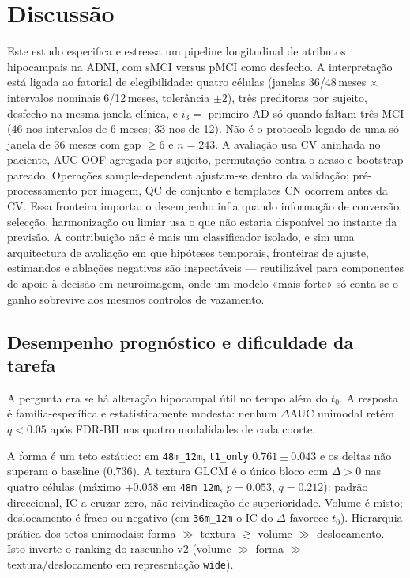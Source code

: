 \documentclass[review]{elsarticle}
\newcommand{\code}[1]{\texttt{#1}}
\begin{document}

\section{Discussão}
\label{sec:discussao}

Este estudo especifica e estressa um pipeline longitudinal de atributos hipocampais na ADNI, com sMCI versus pMCI como desfecho.
A interpretação está ligada ao fatorial de elegibilidade: quatro células (janelas 36/48\,meses $\times$ intervalos nominais 6/12\,meses, tolerância $\pm 2$), três preditoras por sujeito, desfecho na mesma janela clínica, e $i_3=$ primeiro AD só quando faltam três MCI (46 nos intervalos de 6 meses; 33 nos de 12).
Não é o protocolo legado de uma só janela de 36 meses com gap $\ge 6$ e $n=243$.
A avaliação usa CV aninhada no paciente, AUC OOF agregada por sujeito, permutação contra o acaso e bootstrap pareado.
Operações sample-dependent ajustam-se dentro da validação; pré-processamento por imagem, QC de conjunto e templates CN ocorrem antes da CV.
Essa fronteira importa: o desempenho infla quando informação de conversão, selecção, harmonização ou limiar usa o que não estaria disponível no instante da previsão.
A contribuição não é mais um classificador isolado, e sim uma arquitectura de avaliação em que hipóteses temporais, fronteiras de ajuste, estimandos e ablações negativas são inspectáveis --- reutilizável para componentes de apoio à decisão em neuroimagem, onde um modelo «mais forte» só conta se o ganho sobrevive aos mesmos controlos de vazamento.

\subsection{Desempenho prognóstico e dificuldade da tarefa}

A pergunta era se há alteração hipocampal útil no tempo além do $t_0$.
A resposta é família-específica e estatisticamente modesta: nenhum $\Delta$AUC unimodal retém $q<0.05$ após FDR-BH nas quatro modalidades de cada coorte.

A forma é um teto estático: em \code{48m\_12m}, \code{t1\_only} $0.761\pm0.043$ e os deltas não superam o baseline ($0.736$).
A textura GLCM é o único bloco com $\Delta>0$ nas quatro células (máximo $+0.058$ em \code{48m\_12m}, $p=0.053$, $q=0.212$): padrão direccional, IC a cruzar zero, não reivindicação de superioridade.
Volume é misto; deslocamento é fraco ou negativo (em \code{36m\_12m} o IC do $\Delta$ favorece $t_0$).
Hierarquia prática dos tetos unimodais: forma $\gg$ textura $\gtrsim$ volume $\gg$ deslocamento.
Isto inverte o ranking do rascunho v2 (volume $\gg$ forma $\gg$ textura/deslocamento em representação \code{wide}).
\end{document}
